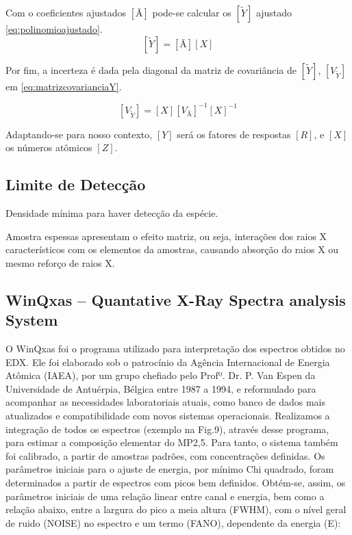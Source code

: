 Com o coeficientes ajustados $[Ã]$ pode-se calcular os $[\tilde{Y}]$ ajustado \ref{eq:polinomioajustado}.
\begin{equation}
  \label{eq:polinomioajustado}
  [\tilde{Y}] = [Ã][X]
\end{equation}

Por fim, a incerteza é dada pela diagonal da matriz de covariância de $[\tilde{Y}]$, 
$[V_{\tilde{Y}}]$ em \ref{eq:matrizcovarianciaY}.

\begin{equation}
  \label{eq:matrizcovarianciaY}
  [V_{\tilde{Y}}] = [X] [V_{Ã}]^{-1} [X]^{-1}
\end{equation}

Adaptando-se para nosso contexto, $[Y]$ será os fatores de respostas $[R]$,
e $[X]$ os números atômicos $[Z]$.

\subsection{Limite de Detecção}

Densidade mínima para haver detecção da espécie. %

Amostra espessas apresentam o efeito matriz, ou seja, interações dos 
raios X característicos com os elementos da amostras, causando 
absorção do raios X ou mesmo reforço de raios X.


\subsection{WinQxas – Quantative X-Ray Spectra analysis System}

O WinQxas foi o programa utilizado para interpretação dos espectros obtidos no EDX. Ele foi elaborado sob o patrocínio da Agência Internacional de Energia Atômica (IAEA), por um grupo chefiado pelo Profº. Dr. P. Van Espen da Universidade de Antuérpia, Bélgica entre 1987 a 1994, e reformulado para acompanhar as necessidades laboratoriais atuais, como banco de dados mais atualizados e compatibilidade com novos sistemas operacionais. 
Realizamos a integração de todos os espectros (exemplo na Fig.9), através desse programa, para estimar a composição elementar do MP2,5. Para tanto, o sistema também foi  calibrado, a partir de amostras padrões, com concentrações definidas. Os parâmetros iniciais para o ajuste de energia, por mínimo Chi quadrado, foram determinados  a partir de espectros com picos bem definidos. Obtém-se, assim, os parâmetros iniciais de uma relação linear entre canal e energia, bem como a relação abaixo, entre a largura do pico a meia altura (FWHM), com o nível geral de ruido (NOISE)  no espectro e um termo (FANO), dependente da energia (E):

